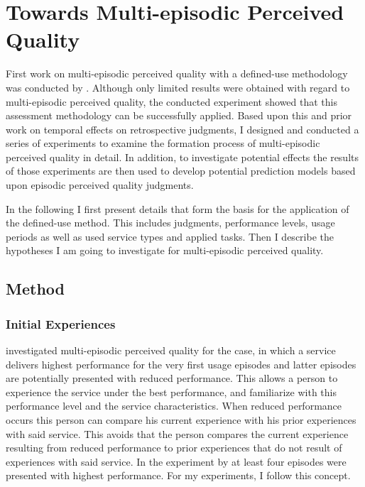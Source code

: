 \chapter{Towards Multi-episodic Perceived Quality}\label{chap:towards}
First work on multi-episodic perceived quality with a defined-use methodology was conducted by \citet{moller_single-call_2011}.
Although only limited results were obtained with regard to multi-episodic perceived quality, the conducted experiment showed that this assessment methodology can be successfully applied.
Based upon this and prior work on temporal effects on retrospective judgments, I designed and conducted a series of experiments to examine the formation process of multi-episodic perceived quality in detail. 
In addition, to investigate potential effects the results of those experiments are then used to develop potential prediction models based upon episodic perceived quality judgments.

In the following I first present details that form the basis for the application of the defined-use method.
This includes judgments, performance levels, usage periods as well as used service types and applied tasks.
Then I describe the hypotheses I am going to investigate for multi-episodic perceived quality.

\section{Method}

\subsection{Initial Experiences}
\citet{moller_single-call_2011} investigated multi-episodic perceived quality for the case, in which a service delivers highest performance for the very first usage episodes and latter episodes are potentially presented with reduced performance.
This allows a person to experience the service under the best performance, and familiarize with this performance level and the service characteristics.
When reduced performance occurs this person can compare his current experience with his prior experiences with said service.
This avoids that the person compares the current experience resulting from reduced performance to prior experiences that do not result of experiences with said service.
In the experiment by \citet{moller_single-call_2011} at least four episodes were presented with highest performance.
For my experiments, I follow this concept.

